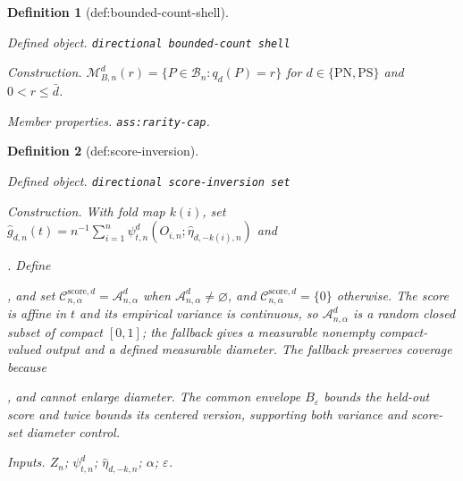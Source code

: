 \documentclass{article}
\newtheorem{definition}{Definition}
\begin{document}
\begin{definition}[def:bounded-count-shell]\label{def:bounded-count-shell}
\par\smallskip\noindent\emph{Defined object.} \texttt{directional bounded-\allowbreak{}count shell}
\par\smallskip\noindent\emph{Construction.} \(\mathcal M_{B,n}^d(r)=\{P\in\mathcal B_n:q_d(P)=r\}\) for \(d\in\{\mathrm{PN},\mathrm{PS}\}\) and \(0<r\le\bar d\).
\par\smallskip\noindent\emph{Member properties.} \texttt{ass:\allowbreak{}rarity-\allowbreak{}cap}.
\end{definition}

\begin{definition}[def:score-inversion]\label{def:score-inversion}
\par\smallskip\noindent\emph{Defined object.} \texttt{directional score-\allowbreak{}inversion set}
\par\smallskip\noindent\emph{Construction.} With fold map \(k(i)\), set \(\widehat g_{d,n}(t)=n^{-1}\sum_{i=1}^n\psi_{t,n}^d(O_{i,n};\widehat\eta_{d,-k(i),n})\) and \par\noindent {}\par\noindent. Define \par\noindent {}\par\noindent, and set \(\mathcal C_{n,\alpha}^{\mathrm{score},d}=\mathcal A_{n,\alpha}^d\) when \(\mathcal A_{n,\alpha}^d\ne\varnothing\), and \(\mathcal C_{n,\alpha}^{\mathrm{score},d}=\{0\}\) otherwise. The score is affine in \(t\) and its empirical variance is continuous, so \(\mathcal A_{n,\alpha}^d\) is a random closed subset of compact \([0,1]\); the fallback gives a measurable nonempty compact-valued output and a defined measurable diameter. The fallback preserves coverage because \par\noindent {}\par\noindent, and cannot enlarge diameter. The common envelope \(B_\varepsilon\) bounds the held-out score and twice bounds its centered version, supporting both variance and score-set diameter control.
\par\smallskip\noindent\emph{Inputs.} \(Z_n\); \(\psi_{t,n}^d\); \(\widehat\eta_{d,-k,n}\); \(\alpha\); \(\varepsilon\).
\end{definition}
\end{document}

